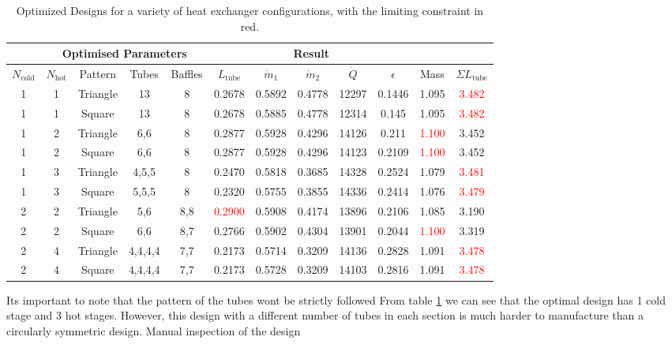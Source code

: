 \documentclass{article}
\begin{document}
\begin{table}[h!]
  \centering
  \begin{tabular}{|c|c|c|c|c|c|c|c|c|c|c|c|}
      \hline
      \rowcolor{gray!30}
      \multicolumn{3}{|c|}{\textbf{Configuration}} & \multicolumn{4}{c|}{\textbf{Optimised Parameters}} & \multicolumn{5}{c|}{\textbf{Result}} \\ \hline
      \rowcolor{gray!10}
      $N_\text{cold}$ & $N_\text{hot}$ & Pattern & Tubes & Baffles & $L_\text{tube}$ & $\dot{m}_1$ & $\dot{m}_2$ & $\dot{Q}$ & $\epsilon$ & Mass & $\Sigma L_\text{tube}$ \\ \hline
      1 & 1 & Triangle & 13 & 8 & 0.2678 & 0.5892 & 0.4778 & 12297 & 0.1446 & 1.095 & \textcolor{red}{3.482} \\ \hline
      1 & 1 & Square & 13 & 8 & 0.2678 & 0.5885 & 0.4778 & 12314 & 0.145 & 1.095 & \textcolor{red}{3.482} \\ \hline
      1 & 2 & Triangle & 6,6 & 8 & 0.2877 & 0.5928 & 0.4296 & 14126 & 0.211 & \textcolor{red}{1.100} & 3.452 \\ \hline
      1 & 2 & Square & 6,6 & 8 & 0.2877 & 0.5928 & 0.4296 & 14123 & 0.2109 & \textcolor{red}{1.100} & 3.452 \\ \hline
      \rowcolor{yellow!30}
      1 & 3 & Triangle & 4,5,5 & 8 & 0.2470 & 0.5818 & 0.3685 & 14328 & 0.2524 & 1.079 & \textcolor{red}{3.481} \\ \hline
      1 & 3 & Square & 5,5,5 & 8 & 0.2320 & 0.5755 & 0.3855 & 14336 & 0.2414 & 1.076 & \textcolor{red}{3.479} \\ \hline
      2 & 2 & Triangle & 5,6 & 8,8 & \textcolor{red}{0.2900} & 0.5908 & 0.4174 & 13896 & 0.2106 & 1.085 & 3.190 \\ \hline
      2 & 2 & Square & 6,6 & 8,7 & 0.2766 & 0.5902 & 0.4304 & 13901 & 0.2044 & \textcolor{red}{1.100} & 3.319 \\ \hline
      2 & 4 & Triangle & 4,4,4,4 & 7,7 & 0.2173 & 0.5714 & 0.3209 & 14136 & 0.2828 & 1.091 & \textcolor{red}{3.478} \\ \hline
      2 & 4 & Square & 4,4,4,4 & 7,7 & 0.2173 & 0.5728 & 0.3209 & 14103 & 0.2816 & 1.091 & \textcolor{red}{3.478} \\ \hline
  \end{tabular}
  \caption{Optimized Designs for a variety of heat exchanger configurations, with the limiting constraint in red.}
  \label{table:designs}
\end{table}

Its important to note that the pattern of the tubes wont be strictly followed 
From table \ref{table:designs} we can see that the optimal design has 1 cold stage and 3 hot stages.
However, this design with a different number of tubes in each section is much harder to manufacture than a circularly symmetric design.
Manual inspection of the design 
\end{document}
